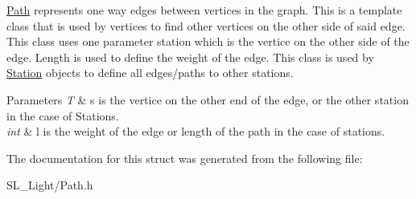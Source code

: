 \mbox{\hyperlink{struct_path}{Path}} represents one way edges between vertices in the graph. This is a template class that is used by vertices to find other vertices on the other side of said edge. This class uses one parameter station which is the vertice on the other side of the edge. Length is used to define the weight of the edge. This class is used by \mbox{\hyperlink{class_station}{Station}} objects to define all edges/paths to other stations.


\begin{DoxyParams}{Parameters}
{\em T} & s is the vertice on the other end of the edge, or the other station in the case of Stations. \\
\hline
{\em int} & l is the weight of the edge or length of the path in the case of stations. \\
\hline
\end{DoxyParams}


The documentation for this struct was generated from the following file\+:\begin{DoxyCompactItemize}
\item 
S\+L\+\_\+\+Light/Path.\+h\end{DoxyCompactItemize}
